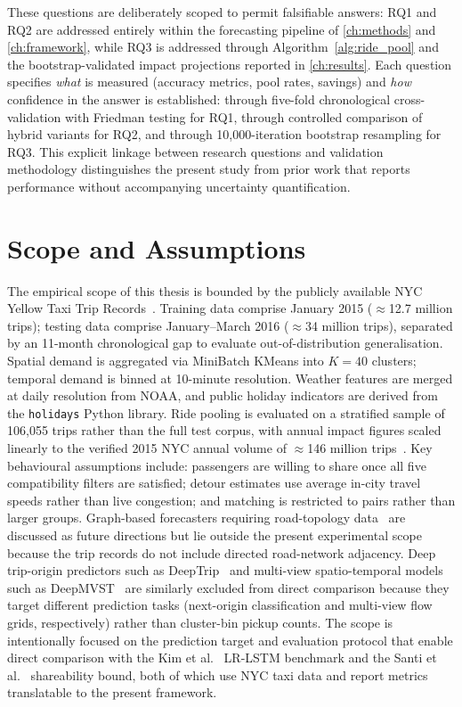 These questions are deliberately scoped to permit falsifiable answers: RQ1 and RQ2 are addressed entirely within the forecasting pipeline of \autoref{ch:methods} and \autoref{ch:framework}, while RQ3 is addressed through Algorithm~\ref{alg:ride_pool} and the bootstrap-validated impact projections reported in \autoref{ch:results}. Each question specifies \emph{what} is measured (accuracy metrics, pool rates, savings) and \emph{how} confidence in the answer is established: through five-fold chronological cross-validation with Friedman testing for RQ1, through controlled comparison of hybrid variants for RQ2, and through 10,000-iteration bootstrap resampling for RQ3. This explicit linkage between research questions and validation methodology distinguishes the present study from prior work that reports performance without accompanying uncertainty quantification.

\section{Scope and Assumptions}

The empirical scope of this thesis is bounded by the publicly available NYC Yellow Taxi Trip Records~\parencite{taxinyc_dataset}. Training data comprise January 2015 ($\approx$12.7 million trips); testing data comprise January--March 2016 ($\approx$34 million trips), separated by an 11-month chronological gap to evaluate out-of-distribution generalisation. Spatial demand is aggregated via MiniBatch KMeans into $K{=}40$ clusters; temporal demand is binned at 10-minute resolution. Weather features are merged at daily resolution from NOAA, and public holiday indicators are derived from the \texttt{holidays} Python library. Ride pooling is evaluated on a stratified sample of 106,055 trips rather than the full test corpus, with annual impact figures scaled linearly to the verified 2015 NYC annual volume of $\approx$146 million trips~\parencite{nyc_opendata_2015}. Key behavioural assumptions include: passengers are willing to share once all five compatibility filters are satisfied; detour estimates use average in-city travel speeds rather than live congestion; and matching is restricted to pairs rather than larger groups. Graph-based forecasters requiring road-topology data~\parencite{li2018diffusion,liu2023staeformer} are discussed as future directions but lie outside the present experimental scope because the trip records do not include directed road-network adjacency. Deep trip-origin predictors such as DeepTrip~\parencite{zhang2023deeptrip} and multi-view spatio-temporal models such as DeepMVST~\parencite{yao2018deeptraffic} are similarly excluded from direct comparison because they target different prediction tasks (next-origin classification and multi-view flow grids, respectively) rather than cluster-bin pickup counts. The scope is intentionally focused on the prediction target and evaluation protocol that enable direct comparison with the Kim et al.~\parencite{kim2020hybrid} LR-LSTM benchmark and the Santi et al.~\parencite{santi2014quantifying} shareability bound, both of which use NYC taxi data and report metrics translatable to the present framework.


